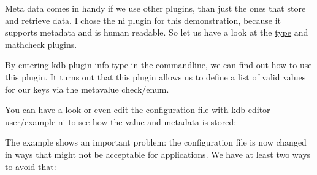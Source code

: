 Meta data comes in handy if we use other plugins, than just the ones that store and retrieve data. I chose the {\ttfamily ni} plugin for this demonstration, because it supports metadata and is human readable. So let us have a look at the \mbox{\hyperlink{autotoc_md695_src_plugins_type_README_md}{type}} and \mbox{\hyperlink{autotoc_md399_src_plugins_mathcheck_README_md}{mathcheck}} plugins.


\begin{DoxyCode}{0}
\DoxyCodeLine{}
\end{DoxyCode}


By entering {\ttfamily kdb plugin-\/info type} in the commandline, we can find out how to use this plugin. It turns out that this plugin allows us to define a list of valid values for our keys via the metavalue {\ttfamily check/enum}.


\begin{DoxyCode}{0}
\end{DoxyCode}


You can have a look or even edit the configuration file with {\ttfamily kdb editor user/example ni} to see how the value and metadata is stored\+:


\begin{DoxyCode}{0}
\DoxyCodeLine{}
\end{DoxyCode}


The example shows an important problem\+: the configuration file is now changed in ways that might not be acceptable for applications. We have at least two ways to avoid that\+:


